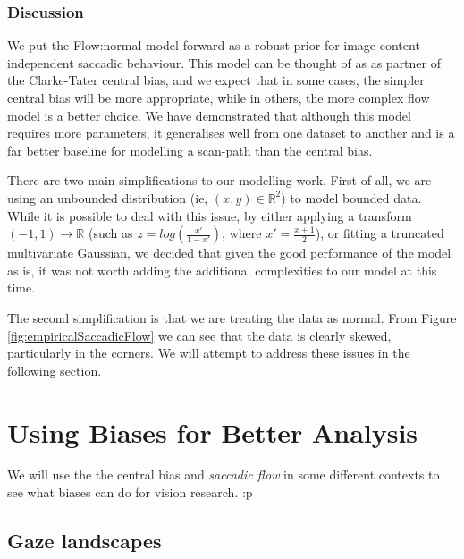 \documentclass[a4paper, onecolumn, oneside, 11pt]{article}
\begin{document}

\subsubsection{Discussion}

We put the Flow:normal model forward as a robust prior for image-content independent saccadic behaviour. This model can be thought of as as partner of the Clarke-Tater central bias, and we expect that in some cases, the simpler central bias will be more appropriate, while in others, the more complex flow model is a better choice. We have demonstrated that although this model requires more parameters, it generalises well from one dataset to another and is a far better baseline for modelling a scan-path than the central bias.

There are two main simplifications to our modelling work. First of all, we are using an unbounded distribution (ie, $(x,y)\in \mathbb{R}^2$) to model bounded data. While it is possible to deal with this issue, by either applying a transform $(-1,1)\rightarrow \mathbb{R}$ (such as $z=log(\frac{x'}{1-x'})$, where $x'=\frac{x+1}{2}$), or fitting a truncated multivariate Gaussian, we decided that given the good performance of the model as is, it was not worth adding the additional complexities to our model at this time. 

The second simplification is that we are treating the data as normal. From Figure \ref{fig:empiricalSaccadicFlow} we can see that the data is clearly skewed, particularly in the corners. We will attempt to address these issues in the following section.


\section{Using Biases for Better Analysis}

We will use the the central bias \citep{clarke-tatler2014} and \textit{saccadic flow} in some different contexts to see what biases can do for vision research. :p


\subsection{Gaze landscapes}
\end{document}
